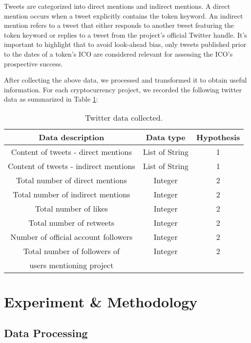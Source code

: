 \documentclass[runningheads]{llncs}
\begin{document}
Tweets are categorized into direct mentions and indirect mentions. A direct mention occurs when a tweet explicitly contains the token keyword. An indirect mention refers to a tweet that either responds to another tweet featuring the token keyword or replies to a tweet from the project's official Twitter handle. It's important to highlight that to avoid look-ahead bias, only tweets published prior to the dates of a token's ICO are considered relevant for assessing the ICO's prospective success.

After collecting the above data, we processed and transformed it to obtain useful information. For each cryptocurrency project, we recorded the following twitter data as summarized in Table \ref{tab4}:

\begin{table}[htbp]
\caption{Twitter data collected.}
\begin{center}
\begin{tabular}{|c|c|c|}
\hline
\textbf{Data description} & \textbf{Data type} & \textbf{Hypothesis} \\
\hline
Content of tweets - direct mentions & List of String & 1 \\
\hline
Content of tweets - indirect mentions & List of String & 1 \\
\hline
Total number of direct mentions & Integer & 2 \\
\hline
Total number of indirect mentions & Integer & 2 \\
\hline
Total number of likes & Integer & 2 \\
\hline
Total number of retweets & Integer & 2 \\
\hline
Number of official account followers & Integer & 2 \\
\hline
Total number of followers of  & Integer & 2 \\
users mentioning project && \\
\hline
\end{tabular}
\label{tab4}
\end{center}
\end{table}

\section{Experiment \& Methodology}

\subsection{Data Processing}
\end{document}
